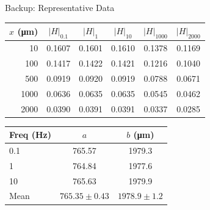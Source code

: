 \documentclass[aspectratio=169,11pt]{beamer}
\begin{document}
\appendix
\begin{frame}{Backup: Representative Data}
\centering
\small
\begin{tabular}{r|ccc|cc}
\toprule
$x$ (\si{\um}) & $|H|_{0.1}$ & $|H|_{1}$ & $|H|_{10}$ & $|H|_{1000}$ & $|H|_{2000}$ \\
\midrule
10   & 0.1607 & 0.1601 & 0.1610 & 0.1378 & 0.1169 \\
100  & 0.1417 & 0.1422 & 0.1421 & 0.1216 & 0.1040 \\
500  & 0.0919 & 0.0920 & 0.0919 & 0.0788 & 0.0671 \\
1000 & 0.0636 & 0.0635 & 0.0635 & 0.0545 & 0.0462 \\
2000 & 0.0390 & 0.0391 & 0.0391 & 0.0337 & 0.0285 \\
\bottomrule
\end{tabular}

\vspace{1em}
\begin{tabular}{lcc}
\toprule
Freq (Hz) & $a$ & $b$ (\si{\um}) \\
\midrule
0.1 & 765.57 & 1979.3 \\
1   & 764.84 & 1977.6 \\
10  & 765.63 & 1979.9 \\
\midrule
Mean & $765.35 \pm 0.43$ & $1978.9 \pm 1.2$ \\
\bottomrule
\end{tabular}
\end{frame}
\end{document}
